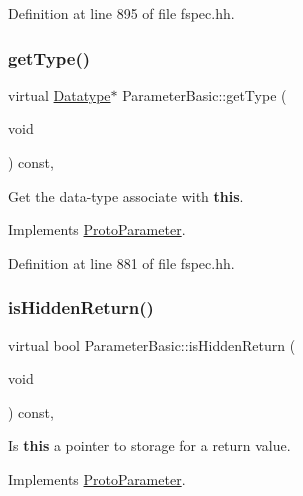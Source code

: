 Definition at line 895 of file fspec.\+hh.

\mbox{\label{class_parameter_basic_a0120ba1a51396ed32a1ff0638f795146}} 
\subsubsection{\texorpdfstring{getType()}{getType()}}
{\footnotesize\ttfamily virtual \mbox{\hyperlink{class_datatype}{Datatype}}$\ast$ Parameter\+Basic\+::get\+Type (\begin{DoxyParamCaption}\item[{void}]{ }\end{DoxyParamCaption}) const\hspace{0.3cm}{\ttfamily [inline]}, {\ttfamily [virtual]}}



Get the data-\/type associate with {\bfseries{this}}. 



Implements \mbox{\hyperlink{class_proto_parameter_a05bfe5b4fe563c1e4e93bf2648239061}{Proto\+Parameter}}.



Definition at line 881 of file fspec.\+hh.

\mbox{\label{class_parameter_basic_aace2399bb8a2f988757037b1b62862e3}} 
\subsubsection{\texorpdfstring{isHiddenReturn()}{isHiddenReturn()}}
{\footnotesize\ttfamily virtual bool Parameter\+Basic\+::is\+Hidden\+Return (\begin{DoxyParamCaption}\item[{void}]{ }\end{DoxyParamCaption}) const\hspace{0.3cm}{\ttfamily [inline]}, {\ttfamily [virtual]}}



Is {\bfseries{this}} a pointer to storage for a return value. 



Implements \mbox{\hyperlink{class_proto_parameter_a104c1c7a9873fafe0394d23bb35feeb4}{Proto\+Parameter}}.



